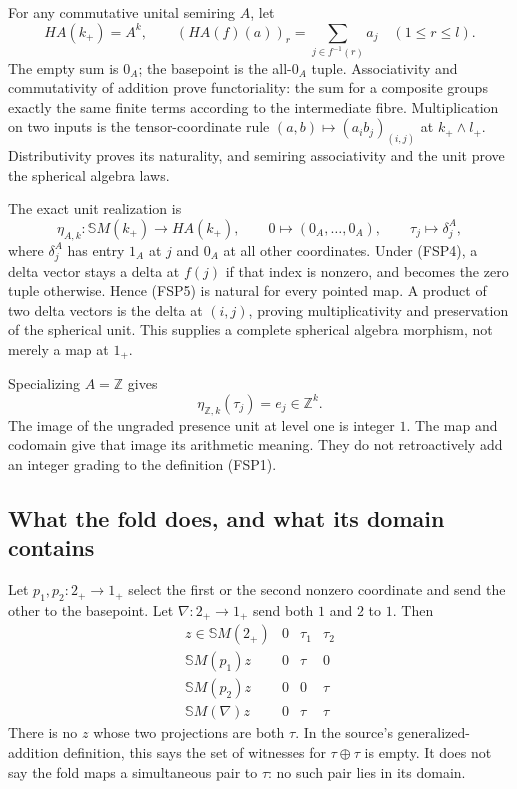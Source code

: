 For any commutative unital semiring $A$, let
\begin{equation}\tag{FSP4}
HA(k_+)=A^k,\qquad
(HA(f)(a))_r=\sum_{j\in f^{-1}(r)}a_j\quad(1\le r\le l).
\end{equation}
The empty sum is $0_A$; the basepoint is the all-$0_A$
tuple. Associativity and commutativity of addition prove
functoriality: the sum for a composite groups exactly the
same finite terms according to the intermediate fibre.
Multiplication on two inputs is the tensor-coordinate rule
$(a,b)\mapsto(a_i b_j)_{(i,j)}$ at $k_+\wedge l_+$.
Distributivity proves its naturality, and semiring
associativity and the unit prove the spherical algebra laws.

The exact unit realization is
\begin{equation}\tag{FSP5}
\eta_{A,k}:\mathbb S M(k_+)\longrightarrow HA(k_+),\qquad
0\longmapsto(0_A,\ldots,0_A),\qquad
\tau_j\longmapsto\delta_j^A,
\end{equation}
where $\delta_j^A$ has entry $1_A$ at $j$ and $0_A$ at
all other coordinates. Under (FSP4), a delta vector stays
a delta at $f(j)$ if that index is nonzero, and becomes
the zero tuple otherwise. Hence (FSP5) is natural for
every pointed map. A product of two delta vectors is the
delta at $(i,j)$, proving multiplicativity and preservation
of the spherical unit. This supplies a complete spherical
algebra morphism, not merely a map at $1_+$.

Specializing $A=\mathbb Z$ gives
\begin{equation}\tag{FSP6}
\eta_{\mathbb Z,k}(\tau_j)=e_j\in\mathbb Z^k.
\end{equation}
The image of the ungraded presence unit at level one is
integer $1$. The map and codomain give that image its
arithmetic meaning. They do not retroactively add an
integer grading to the definition (FSP1).

\subsection{What the fold does, and what its domain contains}

Let $p_1,p_2:2_+\to1_+$ select the first or the second
nonzero coordinate and send the other to the basepoint.
Let $\nabla:2_+\to1_+$ send both $1$ and $2$ to $1$.
Then
\begin{equation}\tag{FSP7}
\begin{array}{c|ccc}
z\in\mathbb S M(2_+)&0&\tau_1&\tau_2\\\hline
\mathbb S M(p_1)z&0&\tau&0\\
\mathbb S M(p_2)z&0&0&\tau\\
\mathbb S M(\nabla)z&0&\tau&\tau
\end{array}
\end{equation}
There is no $z$ whose two projections are both
$\tau$. In the source's generalized-addition
definition, this says the set of witnesses for
$\tau\oplus\tau$ is empty.
It does not say the fold maps a simultaneous pair to
$\tau$: no such pair lies in its domain.

